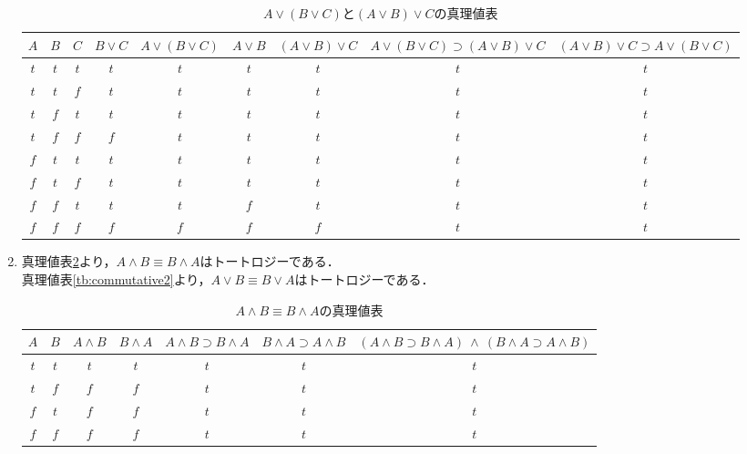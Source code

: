 \documentclass[11pt,dvipdfmx]{jreport}
\begin{document}
\begin{enumerate}
\begin{table}[!htbp]
  \centering
      {\small
        \caption{$A \lor (B \lor C)$と$(A \lor B) \lor C$の真理値表}
        \vspace{3mm}
        \begin{tabular}{c|c|c|c|c|c|c|c|c}
          $A$ & $B$ & $C$ & $B \lor C$ & $A \lor (B \lor C)$ & $A \lor B$ & $(A \lor B) \lor C$ & $A \lor (B \lor C) \supset (A \lor B) \lor C$ & $(A \lor B) \lor C \supset A \lor (B \lor C)$\\ \hline
          $t$ & $t$ & $t$ & $t$ & $t$ & $t$ & $t$ & $t$ & $t$ \\ \hline
          $t$ & $t$ & $f$ & $t$ & $t$ & $t$ & $t$ & $t$ & $t$ \\ \hline
          $t$ & $f$ & $t$ & $t$ & $t$ & $t$ & $t$ & $t$ & $t$ \\ \hline
          $t$ & $f$ & $f$ & $f$ & $t$ & $t$ & $t$ & $t$ & $t$ \\ \hline
          $f$ & $t$ & $t$ & $t$ & $t$ & $t$ & $t$ & $t$ & $t$ \\ \hline
          $f$ & $t$ & $f$ & $t$ & $t$ & $t$ & $t$ & $t$ & $t$ \\ \hline
          $f$ & $f$ & $t$ & $t$ & $t$ & $f$ & $t$ & $t$ & $t$ \\ \hline
          $f$ & $f$ & $f$ & $f$ & $f$ & $f$ & $f$ & $t$ & $t$
        \end{tabular}
        \label{tb:associative2}
      }
\end{table}
 \item 真理値表\ref{tb:commutative1}より，$A \land B \equiv B \land A$はトートロジーである．\\ 
  真理値表\ref{tb:commutative2}より，$A \lor B \equiv B \lor A$はトートロジーである．
\begin{table}[!htbp]
  \centering
  \caption{$A \land B \equiv B \land A$の真理値表}
  \vspace{3mm}
  \begin{tabular}{c|c|c|c|c|c|c}
    $A$ & $B$ & $A \land B$ & $B \land A$ & $A \land B \supset B \land A$ & $B \land A \supset A \land B$ & $(A \land B \supset B \land A) \ \land \ (B \land A \supset A \land B)$ \\ \hline
    $t$ & $t$ & $t$ & $t$ & $t$ & $t$ & $t$ \\ \hline 
    $t$ & $f$ & $f$ & $f$ & $t$ & $t$ & $t$ \\ \hline
    $f$ & $t$ & $f$ & $f$ & $t$ & $t$ & $t$ \\ \hline 
    $f$ & $f$ & $f$ & $f$ & $t$ & $t$ & $t$
  \end{tabular}
  \label{tb:commutative1}
\end{table}


\end{enumerate}
\end{document}
